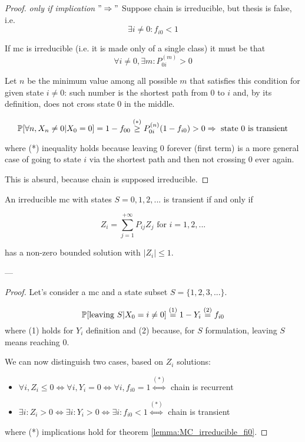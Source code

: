 	\begin{proof} \emph{only if implication} $"\Rightarrow"$
		Suppose chain is irreducible, but thesis is false, i.e.
		$$ \exists i \neq 0 : f_{i0} < 1 $$

		If \gls{mc} is irreducible (i.e. it is made only of a single class) it must be that
		$$ \forall i \neq 0, \exists m : P_{0i}^{(m)} > 0 $$

		Let $n$ be the minimum value among all possible $m$  that satisfies this condition for given state $i \neq 0$: such number is the shortest path from 0 to $i$ and, by its definition, does not cross state 0 in the middle.

		$$ \mathbb{P}[\forall n, X_n \neq 0 | X_0 = 0] = 1 - f_{00} \stackrel{(*)}{\ge} P_{0i}^{(n)} (1 - f_{i0}) > 0 \Rightarrow \text{ state 0 is transient} $$

		where (*) inequality holds because leaving 0 forever (first term) is a more general case of going to state $i$ via the shortest path and then not crossing 0 ever again.

		This is absurd, because chain is supposed irreducible.
	\end{proof}

	\begin{theorem}[4.14]
		An irreducible \gls{mc} with states $S = 0, 1, 2, ...$ is transient if and only if

		$$ Z_i = \sum_{j=1}^{+\infty} P_{ij} Z_j \text{ for } i = 1, 2, ...$$

		has a non-zero bounded solution with $ |Z_i| \le 1$.
	\end{theorem}
	---
	\begin{proof}
		Let's consider a \gls{mc} and a state subset $S = \{1, 2, 3, ...\}$.

		$$ \mathbb{P}[\text{leaving } S| X_0 = i \neq 0] \stackrel{(1)}{=}
			1 - Y_i \stackrel{(2)}{=} f_{i0} $$
		where (1) holds for $Y_i$ definition and (2) because, for $S$ formulation, leaving $S$ means reaching 0.

		We can now distinguish two cases, based on $Z_i$ solutions:
		\begin{itemize}
			\item $ \forall i, Z_i \le 0 \Leftrightarrow \forall i, Y_i = 0 \Leftrightarrow \forall i, f_{i0} = 1 \stackrel{(*)}{\Leftrightarrow} $ chain is recurrent

			\item $ \exists i: Z_i > 0 \Leftrightarrow \exists i: Y_i > 0 \Leftrightarrow \exists i: f_{i0} < 1 \stackrel{(*)}{\Leftrightarrow} $ chain is transient
		\end{itemize}
		where (*) implications hold for theorem \ref{lemma:MC_irreducible_fi0}.
	\end{proof}

